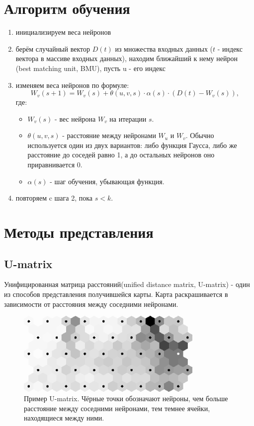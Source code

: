 \documentclass[a4paper,12pt]{article}
\begin{document}
\section{Алгоритм обучения}
\begin{enumerate}
  \item инициализируем веса нейронов
  \item берём случайный вектор $D(t)$ из множества входных данных ($t$ - индекс вектора в массиве входных данных), находим ближайший к нему нейрон (best matching unit, BMU), пусть u - его индекс
  \item изменяем веса нейронов по формуле:
  \[
    W_v(s + 1)=W_v(s)+\theta(u, v, s) \cdot \alpha(s) \cdot (D(t) - W_v(s)),
  \]
  где:
  \begin{itemize}
    \setlength\itemsep{0em}
    \item $W_v(s)$ - вес нейрона $W_v$ на итерации $s$.
    \item $\theta(u, v, s)$ - расстояние между нейронами $W_u$ и $W_v$. Обычно используется один из двух вариантов: либо функция Гаусса, либо же расстояние до соседей равно 1, а до остальных нейронов оно приравнивается 0.
    \item $\alpha(s)$ - шаг обучения, убывающая функция.
  \end{itemize}
  \item повторяем c шага 2, пока $s < k$.\cite{algorithm}
\end{enumerate}

\section{Методы представления}

\subsection{U-matrix}
Унифицированная матрица расстояний(unified distance matrix, U-matrix) - один из способов представления получившейся карты. Карта раскрашивается в зависимости от расстояния между соседними нейронами.\cite{u_matrix}

\begin{figure}[h]
  \centering
  \includegraphics[width=0.8\textwidth]{u-matrix.png}
  \caption{Пример U-matrix. Чёрные точки обозначают нейроны, чем больше расстояние между соседними нейронами, тем темнее ячейки, находящиеся между ними.}
\end{figure}
\end{document}

